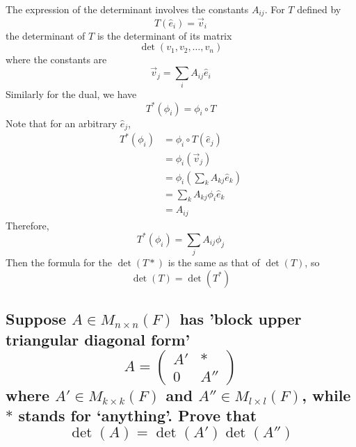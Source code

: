 \documentclass[answers]{exam}
\begin{document}
\begin{questions}
\begin{solution}
	The expression of the determinant involves the constants $A_{ij}$. For $T$ defined by
	$$T(\hat{e}_i) = \vec{v}_i$$
	the determinant of $T$ is the determinant of its matrix
	$$\det(v_1,v_2,\dots,v_n)$$
	where the constants are
	$$\vec{v}_j = \sum_i A_{ij}\hat{e}_i$$
	Similarly for the dual, we have
	$$T^*(\phi_i) = \phi_i \circ T$$
	Note that for an arbitrary $\hat{e}_j$,
	\begin{align*}
		T^*(\phi_i) &= \phi_i \circ T(\hat{e}_j) \\
			    &= \phi_i(\vec{v}_j) \\
			    &= \phi_i\left(\sum_kA_{kj}\hat{e}_k\right) \\
			    &= \sum_kA_{kj}\phi_i\hat{e}_k \\
			    &= A_{ij}
	\end{align*}
	Therefore,
	$$T^*(\phi_i) = \sum_j A_{ij}\phi_j$$
	Then the formula for the $\det(T*)$ is the same as that of $\det(T)$, so
	$$\det(T) = \det(T^*)$$
\end{solution}

\question{}

\begin{parts}
\part{Suppose $A\in M_{n\times n}(F)$ has 'block upper triangular diagonal form'
	$$A = \begin{pmatrix} A' & * \\ 0 & A'' \end{pmatrix}$$
	where $A' \in M_{k\times k}(F)$ and $A'' \in M_{l\times l}(F)$, while $*$ stands for `anything'. Prove that
	$$\det(A) = \det(A')\det(A'')$$
}


\end{parts}
\end{questions}
\end{document}
